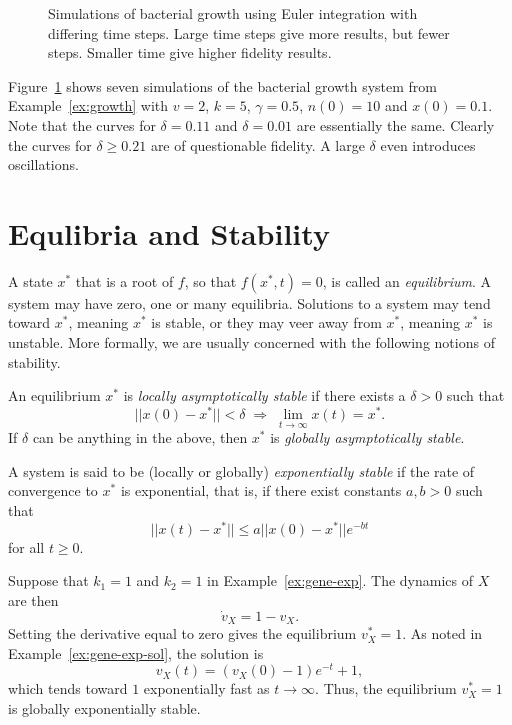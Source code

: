 \begin{figure}
  \caption{\label{fig:euler} Simulations of bacterial growth using Euler integration
    with differing time steps. Large time steps give more results, but
    fewer steps. Smaller time give higher fidelity results.}
\end{figure}

\begin{example}
  Figure~\ref{fig:euler} shows seven simulations of the bacterial
  growth system from Example~\ref{ex:growth} with $v=2$, $k=5$,
  $\gamma=0.5$, $n(0)=10$ and $x(0)=0.1$. Note that the curves for
  $\delta=0.11$ and $\delta=0.01$ are essentially the same. Clearly
  the curves for $\delta \geq 0.21$ are of questionable fidelity. A
  large $\delta$ even introduces oscillations. \enx
\end{example}

\section{Equlibria and Stability}


A state $x^*$ that is a root of $f$, so that $f(x^*,t) = 0$, is
called an {\em equilibrium}. A system may have zero, one or many
equilibria. Solutions to a system may tend toward $x^*$, meaning $x^*$
is stable, or they may veer away from $x^*$, meaning $x^*$ is
unstable. More formally, we are usually concerned with the following
notions of stability. 

\begin{definition} \label{def:stability}
  An equilibrium $x^*$ is {\em locally asymptotically stable} if there
  exists a $\delta>0$ such that 
$$
||x(0)-x^*|| < \delta \; \Rightarrow \; \lim_{t \rightarrow \infty} x(t) = x^* .
$$
If $\delta$ can be anything in the above, then $x^*$ is {\em globally
  asymptotically stable}. 

A system is said to be (locally or globally) {\em exponentially
  stable} if the rate of convergence to $x^*$ is exponential, that is,
if there exist constants $a,b > 0$ such that 
%
$$
||x(t)-x^*|| \leq a ||x(0)-x^*|| e^{-bt}
$$
%
for all $t \geq 0$. 
\end{definition}

\begin{example}
  Suppose that $k_1=1$ and $k_2=1$ in Example~\ref{ex:gene-exp}. The
  dynamics of $X$ are then 
%
$$
\dot v_X = 1 - v_X. 
$$
Setting the derivative equal to zero gives the equilibrium $v_X^* =
1$. As noted in Example~\ref{ex:gene-exp-sol}, the solution is 
%
$$
v_X(t) = ( v_X(0) - 1 ) e^{-t} + 1,
$$
%
which tends toward $1$ exponentially fast as $t \rightarrow
\infty$. Thus, the equilibrium $v_X^* = 1$ is globally exponentially stable. \enx
%
\end{example}

